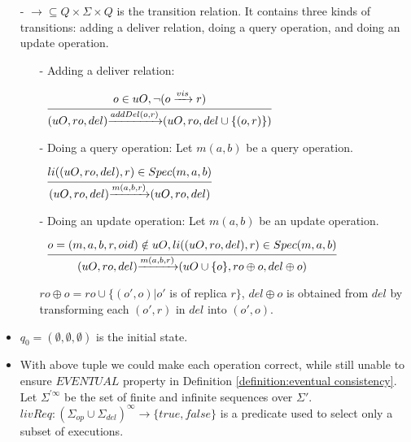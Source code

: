 {\begin{itemize}
\item[-] $\rightarrow \subseteq Q \times \Sigma \times Q$ is the transition relation. It contains three kinds of transitions: adding a deliver relation, doing a query operation, and doing an update operation.

    \begin {itemize}
    \item[-] Adding a deliver relation:

     $\begin{array}{l c} \bigfrac{o \in uO, \neg(o \xrightarrow{vis} r)} {(uO,ro,del) {\xrightarrow{addDel(o,r)}} (uO,ro,del \cup \{ (o,r) \})} \end{array}$

    \item[-] Doing a query operation: Let $m(a,b)$ be a query operation.

     $\begin{array}{l c} \bigfrac{li((uO,ro,del),r) \in Spec(m,a,b)} {(uO,ro,del) {\xrightarrow{m(a,b,r)}} (uO,ro,del)}  \end{array}$

     \item[-] Doing an update operation: Let $m(a,b)$ be an update operation.

     $\begin{array}{l c} \bigfrac{o = (m,a,b,r,oid) \notin uO, li((uO,ro,del),r) \in Spec(m,a,b)} {(uO,ro,del) {\xrightarrow{m(a,b,r)}} (uO \cup \{ o \},ro \oplus o ,del \oplus o)}  \end{array}$

     $ro \oplus o = ro \cup \{ (o',o) \vert o'$ is of replica $r \}$, $del \oplus o$ is obtained from $del$ by transforming each $(o',r)$ in $del$ into $(o',o)$.
    \end{itemize}


\item[-] $q_0=(\emptyset,\emptyset,\emptyset)$ is the initial state.

\item[-] With above tuple we could make each operation correct, while still unable to ensure $\mathit{EVENTUAL}$ property in Definition \ref{definition:eventual consistency}. Let $\Sigma^{'\infty}$ be the set of finite and infinite sequences over $\Sigma'$. $livReq: (\Sigma_{op} \cup \Sigma_{del})^{ \infty } \rightarrow \{ \mathit{true},\mathit{false} \}$ is a predicate used to select only a subset of executions.


\end{itemize}}
